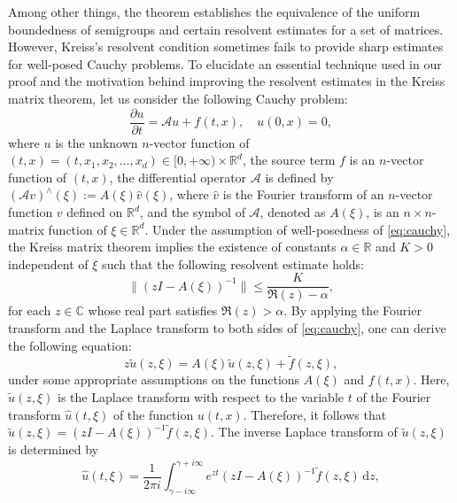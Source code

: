 \documentclass{article}
\theoremstyle{plain}%
\theoremstyle{definition}%
\theoremstyle{remark}%
\newcommand{\bC}{\mathbb{C}}
\newcommand{\bR}{\mathbb{R}}
\newcommand{\cA}{\mathcal{A}}
\newcommand{\rd}{\mathrm{d}}
\newcommand{\+}[1]{{\bm{#1}}}
\newcommand{\pd}[2]{\dfrac{\partial{#1}}{\partial{#2}}}
\begin{document}
Among other things, the theorem establishes the equivalence of the 
uniform boundedness of semigroups and certain resolvent estimates 
for a set of matrices. 
However, Kreiss's resolvent condition sometimes fails to provide  
sharp estimates for well-posed Cauchy problems.
To elucidate an essential technique used in our proof and the 
motivation behind improving the resolvent estimates in the Kreiss 
matrix theorem, let us consider the following Cauchy problem:
\begin{equation}\label{eq:cauchy}
  \pd{u}{t} = \cA u + f(t, x), \quad u(0, x) = 0,
\end{equation}
where $u$ is the unknown $n$-vector function of 
$(t, x) = (t, x_1, x_2, \ldots, x_d) \in [0, +\infty) \times \bR^d$,
the source term $f$ is an $n$-vector function of $(t, x)$,
the differential operator $\cA$ is defined by 
$(\cA v)^{\wedge}(\xi) := A(\xi) \hat{v}(\xi)$, where 
$\hat{v}$ is the Fourier transform of an $n$-vector function $v$ 
defined on $\bR^d$, 
and the symbol of $\cA$, denoted as $A(\xi)$, is an 
$n \times n$-matrix function of $\xi \in \bR^d$.
Under the assumption of well-posedness 
\cite{kreiss_initial-boundary_2004} of \cref{eq:cauchy}, the Kreiss 
matrix theorem implies the existence of constants $\alpha \in \bR$ 
and $K > 0$ independent of $\xi$ such that the following resolvent 
estimate holds:
\begin{equation}\label{eq:cauchy_KMTbound}
  \|{(z I - A(\xi))^{-1}}\| \le \frac{K}{\Re(z) - \alpha}, 
\end{equation}
for each $z \in \bC$ whose real part satisfies $\Re(z) > \alpha$.
By applying the Fourier transform and the Laplace transform to both 
sides of \cref{eq:cauchy}, one can derive the following equation:
\begin{displaymath}
  z \tilde{u}(z, \xi) = A(\xi) \tilde{u}(z, \xi) 
    + \tilde{f}(z, \xi),
\end{displaymath}
under some appropriate assumptions on the functions $A(\xi)$ and 
$f(t, x)$. Here, $\tilde{u}(z, \xi)$ is the Laplace transform with 
respect to the variable $t$ of the Fourier transform $\hat{u}(t, \xi)$
of the function $u(t, x)$.
Therefore, it follows that $\tilde{u}(z, \xi) = (z I - A(\xi))^{-1} 
\tilde{f}(z, \xi)$.
The inverse Laplace transform of $\tilde{u}(z, \xi)$ is determined 
by  
\begin{displaymath}
  \hat{u}(t, \xi) = \frac{1}{2 \pi i} 
    \int_{\gamma - i \infty}^{\gamma + i \infty}
    e^{z t} (z I - A(\xi))^{-1} \tilde{f}(z, \xi) \,\rd z,
\end{displaymath}
\end{document}
